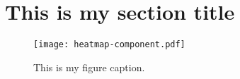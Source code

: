 \section{This is my section title}\label{component}
\begin{figure}[!ht]
\begin{center}
\texttt{[image: heatmap-component.pdf]}
\end{center}
\caption{This is my figure caption.}
\end{figure}
